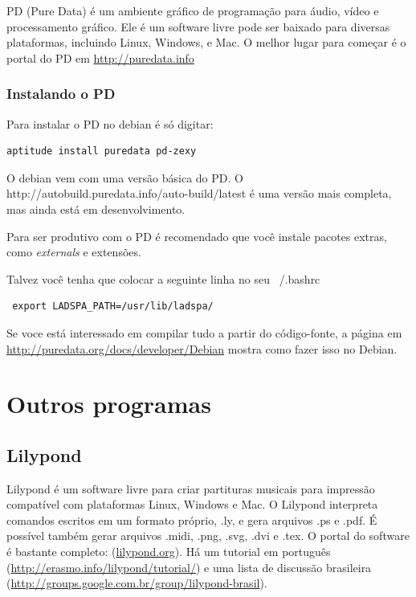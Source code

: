 \documentclass[12pt,brazil]{book}
\begin{document}
PD (Pure Data) é um ambiente gráfico de programação para áudio, vídeo
e processamento gráfico. Ele é um software livre pode ser baixado para
diversas plataformas, incluindo Linux, Windows, e Mac. O melhor lugar
para começar é o portal do PD em \url{http://puredata.info}

\section{Instalando o PD}

Para instalar o PD no debian é só digitar:

\begin{verbatim}
aptitude install puredata pd-zexy
\end{verbatim}

O debian vem com uma versão básica do PD. O
{http://autobuild.puredata.info/auto-build/latest} é uma versão mais
completa, mas ainda está em desenvolvimento.

Para ser produtivo com o PD é recomendado que você instale pacotes
extras, como \textit{externals} e extensões.

Talvez você tenha que colocar a seguinte linha no seu ~/.bashrc

\begin{verbatim}
 export LADSPA_PATH=/usr/lib/ladspa/
\end{verbatim}

Se voce está interessado em compilar tudo a partir do código-fonte, a
página em \url{http://puredata.org/docs/developer/Debian} mostra como
fazer isso no Debian.

\part{Outros programas}
\label{part:outros-programas}

\chapter{Lilypond}
\label{sec:lilypond}

Lilypond é um software livre para criar partituras musicais para
impressão compatível com plataformas Linux, Windows e Mac. O Lilypond
interpreta comandos escritos em um formato próprio, .ly, e gera
arquivos .ps e .pdf. É possível também gerar arquivos .midi, .png,
.svg, .dvi e .tex. O portal do software é bastante completo:
(\url{lilypond.org}). Há um tutorial em português
(\url{http://erasmo.info/lilypond/tutorial/}) e uma lista de discussão
brasileira (\url{http://groups.google.com.br/group/lilypond-brasil}).
\end{document}
